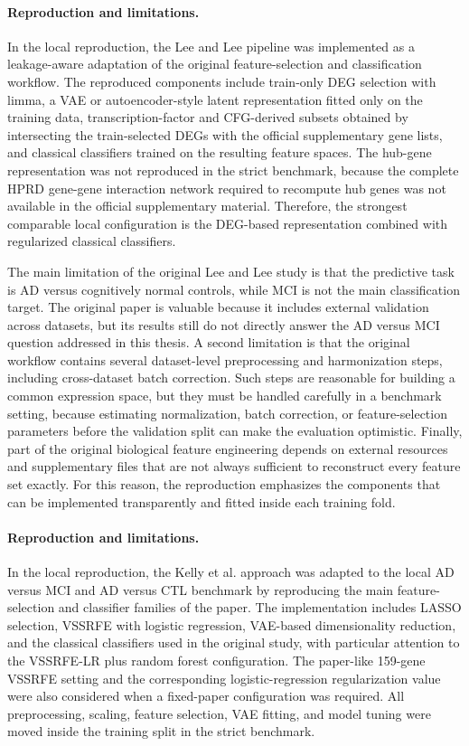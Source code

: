 \paragraph{Reproduction and limitations.}
In the local reproduction, the Lee and Lee pipeline was implemented as a leakage-aware adaptation of the original feature-selection and classification workflow. The reproduced components include train-only DEG selection with limma, a VAE or autoencoder-style latent representation fitted only on the training data, transcription-factor and CFG-derived subsets obtained by intersecting the train-selected DEGs with the official supplementary gene lists, and classical classifiers trained on the resulting feature spaces. The hub-gene representation was not reproduced in the strict benchmark, because the complete HPRD gene-gene interaction network required to recompute hub genes was not available in the official supplementary material. Therefore, the strongest comparable local configuration is the DEG-based representation combined with regularized classical classifiers.

The main limitation of the original Lee and Lee study is that the predictive task is AD versus cognitively normal controls, while MCI is not the main classification target. The original paper is valuable because it includes external validation across datasets, but its results still do not directly answer the AD versus MCI question addressed in this thesis. A second limitation is that the original workflow contains several dataset-level preprocessing and harmonization steps, including cross-dataset batch correction. Such steps are reasonable for building a common expression space, but they must be handled carefully in a benchmark setting, because estimating normalization, batch correction, or feature-selection parameters before the validation split can make the evaluation optimistic. Finally, part of the original biological feature engineering depends on external resources and supplementary files that are not always sufficient to reconstruct every feature set exactly. For this reason, the reproduction emphasizes the components that can be implemented transparently and fitted inside each training fold.

\paragraph{Reproduction and limitations.}
In the local reproduction, the Kelly et al. approach was adapted to the local AD versus MCI and AD versus CTL benchmark by reproducing the main feature-selection and classifier families of the paper. The implementation includes LASSO selection, VSSRFE with logistic regression, VAE-based dimensionality reduction, and the classical classifiers used in the original study, with particular attention to the VSSRFE-LR plus random forest configuration. The paper-like 159-gene VSSRFE setting and the corresponding logistic-regression regularization value were also considered when a fixed-paper configuration was required. All preprocessing, scaling, feature selection, VAE fitting, and model tuning were moved inside the training split in the strict benchmark.

